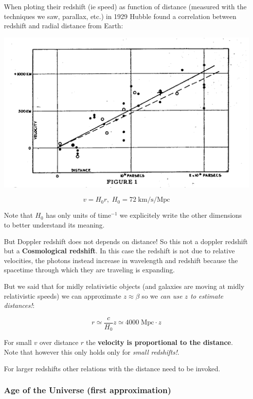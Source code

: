 \documentclass[
  letterpaper,
  DIV=11,
  numbers=noendperiod]{scrreprt}
\begin{document}
When ploting their redshift (ie speed) as function of distance (measured
with the techniques we saw, parallax, etc.) in 1929 Hubble found a
correlation between redshift and radial distance from Earth:

\begin{center}
\includegraphics{images/unnamed.gif}
\end{center}

\[v = H_0 r, \; H_0 = 72\;\mathrm{ km/s/Mpc}\]

Note that \(H_0\) has only units of time\(^{-1}\) we explicitely write
the other dimensions to better understand its meaning.

But Doppler redshift does not depends on distance! So this not a doppler
redshift but a \textbf{Cosmological redshift}. In this case the redshift
is not due to relative velocities, the photons instead increase in
wavelength and redshift because the spacetime through which they are
traveling is expanding.

But we said that for midly relativistic objects (and galaxies are moving
at midly relativistic speeds) we can approximate \(z \approx \beta\) so
we \emph{can use \(z\) to estimate distances!}:

\[r \simeq \frac{c}{H_0}z \simeq 4000\;\mathrm{ Mpc}\cdot z\]

For small \(v\) over distance \(r\) the \textbf{velocity is proportional
to the distance}. Note that however this only holds only for \emph{small
redshifts!}.

For larger redshifts other relations with the distance need to be
invoked.

\subsubsection*{Age of the Universe (first
approximation)}\label{age-of-the-universe-first-approximation}
\end{document}
